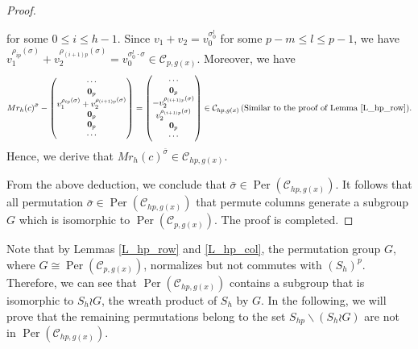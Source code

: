 \documentclass[journal,12pt,onecolumn]{IEEEtran}
\begin{document}
\begin{proof}
\begin{itemize}
\[        \]
        for some $0\le i \le h-1$. Since $v_1+v_2 = v_0^{\sigma_0^l}$ for some $p-m\le l\le p-1$, we have $v_1^{\rho_{ip}(\sigma)} + v_2^{\rho_{(i+1)p}(\sigma)} = v_0^{\sigma_0^l\cdot \sigma}\in \mathcal{C}_{p,g(x)}$. Moreover, we have 
        \[
            Mr_{h}(c)^{\bar{\sigma}} - \begin{pmatrix}
                \cdots \\
                {\bf 0}_p \\
                v_1^{\rho_{ip}(\sigma)}+v_2^{\rho_{(i+1)p}(\sigma)} \\
                {\bf 0}_p \\
                {\bf 0}_p \\
                \cdots
            \end{pmatrix} = \begin{pmatrix}
                \cdots \\
                {\bf 0}_p \\
                -v_2^{\rho_{(i+1)p}(\sigma)} \\
                v_2^{\rho_{(i+1)p}(\sigma)} \\
                {\bf 0}_p \\
                \cdots
            \end{pmatrix}\in \mathcal{C}_{hp,g(x)}\,(\text{Similar to the proof of Lemma \ref{L_hp_row}}).
        \]
        Hence, we derive that $Mr_{h}(c)^{\bar{\sigma}}\in \mathcal{C}_{hp,g(x)}$.
    \end{itemize}
    From the above deduction, we conclude that $\bar{\sigma}\in \operatorname{Per}(\mathcal{C}_{hp,g(x)})$. It follows that all permutation $\bar{\sigma}\in\operatorname{Per}(\mathcal{C}_{hp,g(x)})$ that permute columns generate a subgroup $G$ which is isomorphic to $\operatorname{Per}(\mathcal{C}_{p,g(x)})$. The proof is completed.
\end{proof}

 
 Note that by Lemmas \ref{L_hp_row} and \ref{L_hp_col}, the permutation group $G$, where $G\cong \operatorname{Per}(\mathcal{C}_{p,g(x)})$, normalizes but not commutes with $(S_h)^p$. Therefore, we can see that $\operatorname{Per}(\mathcal{C}_{hp,g(x)})$ contains a subgroup that is isomorphic to $S_h \wr G$, the wreath product of \(S_h\) by \(G\). In the following, we will prove that the remaining permutations belong to the set $S_{hp}\backslash(S_h \wr G)$ are not in $\operatorname{Per}(\mathcal{C}_{hp,g(x)})$. 
\end{document}
